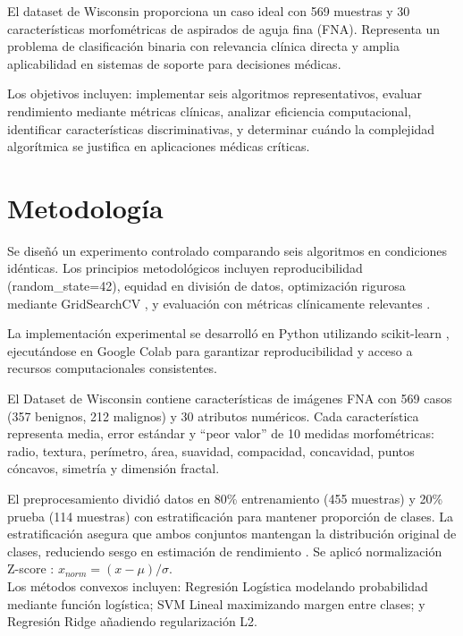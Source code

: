\documentclass[conference]{IEEEtran}
\begin{document}
El dataset de Wisconsin \cite{wolberg1995} proporciona un caso ideal con 569 muestras y 30 características morfométricas de aspirados de aguja fina (FNA). Representa un problema de clasificación binaria con relevancia clínica directa y amplia aplicabilidad en sistemas de soporte para decisiones médicas.

Los objetivos incluyen: implementar seis algoritmos representativos, evaluar rendimiento mediante métricas clínicas, analizar eficiencia computacional, identificar características discriminativas, y determinar cuándo la complejidad algorítmica se justifica en aplicaciones médicas críticas.

\section{Metodología}

Se diseñó un experimento controlado comparando seis algoritmos en condiciones idénticas. Los principios metodológicos incluyen reproducibilidad (random\_state=42), equidad en división de datos, optimización rigurosa mediante GridSearchCV \cite{bergstra2012}, y evaluación con métricas clínicamente relevantes \cite{fawcett2006}.

La implementación experimental se desarrolló en Python utilizando scikit-learn \cite{pedregosa2011}, ejecutándose en Google Colab para garantizar reproducibilidad y acceso a recursos computacionales consistentes.

El Dataset de Wisconsin \cite{street1993} contiene características de imágenes FNA con 569 casos (357 benignos, 212 malignos) y 30 atributos numéricos. Cada característica representa media, error estándar y ``peor valor'' de 10 medidas morfométricas: radio, textura, perímetro, área, suavidad, compacidad, concavidad, puntos cóncavos, simetría y dimensión fractal.

El preprocesamiento dividió datos en 80\% entrenamiento (455 muestras) y 20\% prueba (114 muestras) con estratificación \cite{kohavi1995} para mantener proporción de clases. La estratificación asegura que ambos conjuntos mantengan la distribución original de clases, reduciendo sesgo en estimación de rendimiento \cite{kohavi1995}. Se aplicó normalización Z-score \cite{jain2005}: $x_{norm} = (x - \mu)/\sigma$.\\

Los métodos convexos \cite{boyd2004} incluyen: Regresión Logística modelando probabilidad mediante función logística; SVM Lineal \cite{vapnik1995} maximizando margen entre clases; y Regresión Ridge \cite{hoerl1970} añadiendo regularización L2.
\end{document}
